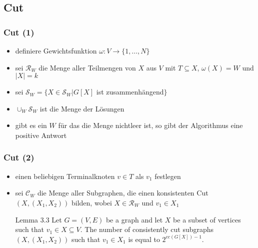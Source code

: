\documentclass{beamer}
\begin{document}
\subsection{Cut}
\begin{frame}
\frametitle{Cut (1)}
\begin{itemize}
\item definiere Gewichtsfunktion $\omega:V\rightarrow \{1,\dots,N\}$ 
\item sei $\mathcal{R}_W$ die Menge aller Teilmengen von $X$ aus $V$ mit $T \subseteq X$, $\omega(X)=W$ und $|X|=k$
\item sei  $\mathcal{S}_W=\{X \in \mathcal{S}_W | G[X]$ ist zusammenhängend$\}$ 
\item $\cup_W \mathcal{S}_W$ ist die Menge der Lösungen
\item gibt es ein $W$ für das die Menge nichtleer ist, so gibt der Algorithmus eine positive Antwort
\end{itemize}
\end{frame}
\begin{frame}
\frametitle{Cut (2)}
\begin{itemize}
\item einen beliebigen Terminalknoten $v \in T$ als $v_1$ festlegen
\item sei $\mathcal{C}_W$ die Menge aller Subgraphen, die einen konsistenten Cut $(X,(X_1,X_2))$ bilden, wobei $X\in \mathcal{R}_W$ und $v_1 \in X_1$ 
\newline
\newline
\begin{block}{Lemma 3.3}
Let $G=(V,E)$ be a graph and let $X$ be a subset of vertices such that $v_1 \in X \subseteq V$. The number of
consistently cut subgraphs $(X,(X_1,X_2))$ such that $v_1 \in X_1$ is equal to $2^{cc(G[X])-1}$.
\end{block}

\end{itemize}
\end{frame}
\end{document}
